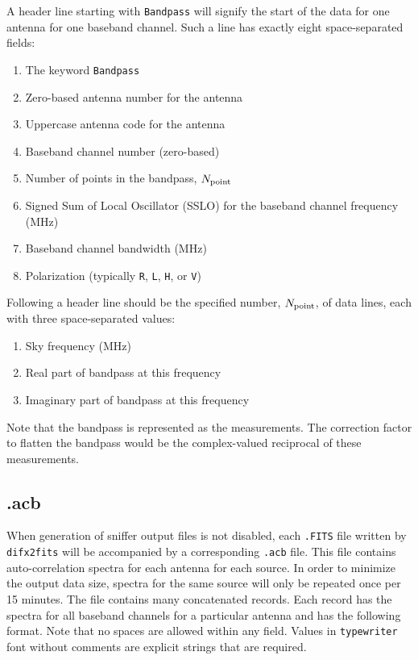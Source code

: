 A header line starting with {\tt Bandpass} will signify the start of the data for one antenna for one baseband channel.
Such a line has exactly eight space-separated fields:
\begin{enumerate}
  \item The keyword {\tt Bandpass}
  \item Zero-based antenna number for the antenna
  \item Uppercase antenna code for the antenna
  \item Baseband channel number (zero-based)
  \item Number of points in the bandpass, $N_{\rm point}$
  \item Signed Sum of Local Oscillator (SSLO) for the baseband channel frequency (MHz)
  \item Baseband channel bandwidth (MHz)
  \item Polarization (typically {\tt R}, {\tt L}, {\tt H}, or {\tt V})
\end{enumerate}

Following a header line should be the specified number, $N_{\rm point}$, of data lines, each with three space-separated values:
\begin{enumerate}
  \item Sky frequency (MHz)
  \item Real part of bandpass at this frequency
  \item Imaginary part of bandpass at this frequency
\end{enumerate}

Note that the bandpass is represented as the measurements.
The correction factor to flatten the bandpass would be the complex-valued reciprocal of these measurements.









\subsection{.acb} \label{sec:acb}

When generation of sniffer output files is not disabled, each {\tt .FITS} file written by {\tt difx2fits} will be accompanied by a corresponding {\tt .acb} file. 
This file contains auto-correlation spectra for each antenna for each source.
In order to minimize the output data size, spectra for the same source will only be repeated once per 15 minutes.
The file contains many concatenated records.
Each record has the spectra for all baseband channels for a particular antenna and has the following format.  
Note that no spaces are allowed within any field.
Values in {\tt typewriter} font without comments are explicit strings that are required.

